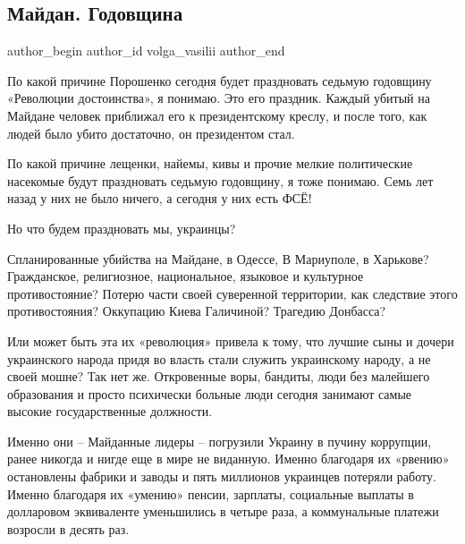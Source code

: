  
 
 
 
 
 
\subsection{Майдан. Годовщина}
\label{sec:21_11_2020.fb.volga_vasilii.1.maidan_godovschina}
\ifcmt
	author_begin
   author_id volga_vasilii
	author_end
\fi

По какой причине Порошенко сегодня будет праздновать седьмую годовщину
«Революции достоинства», я понимаю. Это его праздник. Каждый убитый на Майдане
человек приближал его к президентскому креслу, и после того, как людей было
убито достаточно, он президентом стал.

По какой причине лещенки, найемы, кивы и прочие мелкие политические насекомые
будут праздновать седьмую годовщину, я тоже понимаю. Семь лет назад у них не
было ничего, а сегодня у них есть ФСЁ! 

Но что будем праздновать мы, украинцы?

Спланированные убийства на Майдане, в Одессе, В Мариуполе, в Харькове?
Гражданское, религиозное, национальное, языковое и культурное противостояние?
Потерю части своей суверенной территории, как следствие этого противостояния?
Оккупацию Киева Галичиной? Трагедию Донбасса?

Или может быть эта их «революция» привела к тому, что лучшие сыны и дочери
украинского народа придя во власть стали служить украинскому народу, а не своей
мошне? Так нет же. Откровенные воры, бандиты, люди без малейшего образования и
просто психически больные люди сегодня занимают самые высокие государственные
должности. 

Именно они – Майданные лидеры – погрузили Украину в пучину коррупции, ранее
никогда и нигде еще в мире не виданную. Именно благодаря их «рвению»
остановлены фабрики и заводы и пять миллионов украинцев потеряли работу. Именно
благодаря их «умению» пенсии, зарплаты, социальные выплаты в долларовом
эквиваленте уменьшились в четыре раза, а коммунальные платежи возросли в десять
раз. 


